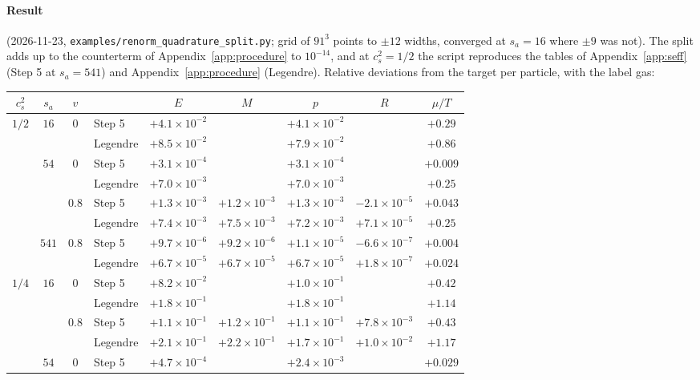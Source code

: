 \documentclass[11pt,aps,preprint,nofootinbib,superscriptaddress,tightenlines]{revtex4-2}
\def\App#1{Appendix~\ref{#1}}
\let\oldparagraph\paragraph
\renewcommand{\paragraph}{\par\bigskip\oldparagraph}
\begin{document}
\paragraph{Result} (2026-11-23, \nolinkurl{examples/renorm_quadrature_split.py}; grid of $91^3$ points to $\pm12$ widths, converged at $s_a=16$ where $\pm9$ was not).
The split adds up to the counterterm of \App{app:procedure} to $10^{-14}$, and at $c_s^2=1/2$ the script reproduces the tables of \App{app:seff} (Step 5 at $s_a=541$)
and \App{app:procedure} (Legendre).  Relative deviations from the target per particle, with the label gas:
\begin{center}
\small
\begin{tabular}{cccl ccccc}
\toprule
$c_s^2$ & $s_a$ & $v$ & & $E$ & $M$ & $p$ & $R$ & $\mu/T$ \\
\midrule
$1/2$ & $16$ & $0$ & Step 5 & $+4.1\times10^{-2}$ & & $+4.1\times10^{-2}$ & & $+0.29$ \\
 & & & Legendre & $+8.5\times10^{-2}$ & & $+7.9\times10^{-2}$ & & $+0.86$ \\
 & $54$ & $0$ & Step 5 & $+3.1\times10^{-4}$ & & $+3.1\times10^{-4}$ & & $+0.009$ \\
 & & & Legendre & $+7.0\times10^{-3}$ & & $+7.0\times10^{-3}$ & & $+0.25$ \\
 & & $0.8$ & Step 5 & $+1.3\times10^{-3}$ & $+1.2\times10^{-3}$ & $+1.3\times10^{-3}$ & $-2.1\times10^{-5}$ & $+0.043$ \\
 & & & Legendre & $+7.4\times10^{-3}$ & $+7.5\times10^{-3}$ & $+7.2\times10^{-3}$ & $+7.1\times10^{-5}$ & $+0.25$ \\
 & $541$ & $0.8$ & Step 5 & $+9.7\times10^{-6}$ & $+9.2\times10^{-6}$ & $+1.1\times10^{-5}$ & $-6.6\times10^{-7}$ & $+0.004$ \\
 & & & Legendre & $+6.7\times10^{-5}$ & $+6.7\times10^{-5}$ & $+6.7\times10^{-5}$ & $+1.8\times10^{-7}$ & $+0.024$ \\
\midrule
$1/4$ & $16$ & $0$ & Step 5 & $+8.2\times10^{-2}$ & & $+1.0\times10^{-1}$ & & $+0.42$ \\
 & & & Legendre & $+1.8\times10^{-1}$ & & $+1.8\times10^{-1}$ & & $+1.14$ \\
 & & $0.8$ & Step 5 & $+1.1\times10^{-1}$ & $+1.2\times10^{-1}$ & $+1.1\times10^{-1}$ & $+7.8\times10^{-3}$ & $+0.43$ \\
 & & & Legendre & $+2.1\times10^{-1}$ & $+2.2\times10^{-1}$ & $+1.7\times10^{-1}$ & $+1.0\times10^{-2}$ & $+1.17$ \\
 & $54$ & $0$ & Step 5 & $+4.7\times10^{-4}$ & & $+2.4\times10^{-3}$ & & $+0.029$ \\

\end{tabular}
\end{center}
\end{document}
